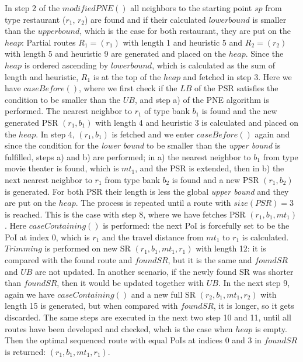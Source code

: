 In step 2 of the $modifiedPNE()$ all neighbors to the starting point $sp$ from type restaurant ($r_1$, $r_2$) are found and if their calculated $lower bound$ is smaller than the $upper bound$, which is the case for both restaurant, they are put on the $heap$: Partial routes $R_1 = (r_1)$ with length 1 and heuristic 5 and $R_2 = (r_2)$ with length 5 and heuristic 9 are generated and placed on the $heap$. Since the $heap$ is ordered ascending by $lower bound$, which is calculated as the sum of length and heuristic, $R_1$ is at the top of the $heap$ and fetched in step 3. Here we have $caseBefore()$, where we first check if the $LB$ of the PSR satisfies the condition to be smaller than the $UB$, and step a) of the PNE algorithm is performed. The nearest neighbor to $r_1$ of type bank $b_1$ is found and the new generated PSR $(r_1, b_1)$ with length 4 and heuristic 3 is calculated and placed on the $heap$. In step 4, $(r_1, b_1)$ is fetched and we enter $caseBefore()$ again and since the condition for the \textit{lower bound} to be smaller than the \textit{upper bound} is fulfilled, steps a) and b) are performed; in a) the nearest neighbor to $b_1$ from type movie theater is found, which is $mt_1$, and the PSR is extended, then in b) the next nearest neighbor to $r_1$ from type bank $b_2$ is found and a new PSR $(r_1, b_2)$ is generated. For both PSR their length is less the global \textit{upper bound} and they are put on the $heap$. The process is repeated until a route with $size(PSR) = 3$ is reached. This is the case with step 8, where we have fetches PSR $(r_1, b_1, mt_1)$. Here $caseContaining()$ is performed: the next PoI is forcefully set to be the PoI at index 0, which is $r_1$ and the travel distance from $mt_1$ to $r_1$ is calculated. $Trimming$ is performed on new SR $(r_1, b_1, mt_1, r_1)$ with length 12: it is compared with the found route and $foundSR$, but it is the same and $foundSR$ and $UB$ are not updated. In another scenario, if the newly found SR was shorter than $foundSR$, then it would be updated together with $UB$. In the next step 9, again we have $caseContaining()$ and a new full SR $(r_2, b_1, mt_1, r_2)$ with length 15 is generated, but when compared with $foundSR$, it is longer, so it gets discarded. The same steps are executed in the next two step 10 and 11, until all routes have been developed and checked, whch is the case when $heap$ is empty. Then the optimal sequenced route with equal PoIs at indices 0 and 3 in $foundSR$ is returned: $(r_1, b_1, mt_1, r_1)$.

